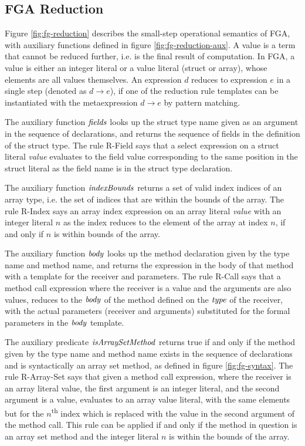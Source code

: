 

\subsection{FGA Reduction}

Figure \ref{fig:fg-reduction} describes the small-step operational semantics of
FGA, with auxiliary functions defined in figure \ref{fig:fg-reduction-aux}. A
value is a term that cannot be reduced further, i.e. is the final result of
computation. In FGA, a value is either an integer literal or a value literal
(struct or array), whose elements are all values themselves. An expression $d$
reduces to expression $e$ in a single step (denoted as $d \to e$), if one of the
reduction rule templates can be instantiated with the metaexpression $d \to e$
by pattern matching.

The auxiliary function $\mathit{fields}$ looks up the struct type name given as an
argument in the sequence of declarations, and returns the sequence of fields in
the definition of the struct type. The rule R-Field says that a select
expression on a struct literal \emph{value} evaluates to the field value
corresponding to the same position in the struct literal as the field name is in
the struct type declaration.

The auxiliary function $\mathit{indexBounds}$ returns a set of valid index indices of an
array type, i.e. the set of indices that are within the bounds of the array. The
rule R-Index says an array index expression on an array literal \emph{value}
with an integer literal $n$ as the index reduces to the element of the array at
index $n$, if and only if $n$ is within bounds of the array.

The auxiliary function $\mathit{body}$ looks up the method declaration given by the
type name and method name, and returns the expression in the body of that method
with a template for the receiver and parameters. The rule R-Call says that a
method call expression where the receiver is a value and the arguments are also
values, reduces to the $\mathit{body}$ of the method defined on the $\mathit{type}$ of the
receiver, with the actual parameters (receiver and arguments) substituted for
the formal parameters in the $\mathit{body}$ template.

The auxiliary predicate $\mathit{isArraySetMethod}$ returns true if and only if the
method given by the type name and method name exists in the sequence of
declarations and is syntactically an array set method, as defined in figure
\ref{fig:fg-syntax}. The rule R-Array-Set says that given a method call
expression, where the receiver is an array literal value, the first argument is
an integer literal, and the second argument is a value, evaluates to an array
value literal, with the same elements but for the $n$\textsuperscript{th} index
which is replaced with the value in the second argument of the method call. This
rule can be applied if and only if the method in question is an array set method
and the integer literal $n$ is within the bounds of the array.

